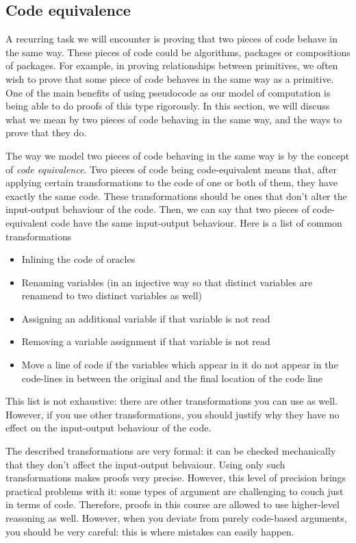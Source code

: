 \subsection{Code equivalence}
A recurring task we will encounter is proving that two pieces of code behave in the same way. These pieces of code could be algorithms, packages or compositions of packages. For example, in proving relationships between primitives, we often wish to prove that some piece of code behaves in the same way as a primitive. One of the main benefits of using pseudocode as our model of computation is being able to do proofs of this type rigorously. In this section, we will discuss what we mean by two pieces of code behaving in the same way, and the ways to prove that they do.

The way we model two pieces of code behaving in the same way is by the concept of \emph{code equivalence}. Two pieces of code being code-equivalent means that, after applying certain transformations to the code of one or both of them, they have exactly the same code. These transformations should be ones that don't alter the input-output behaviour of the code. Then, we can say that two pieces of code-equivalent code have the same input-output behaviour. Here is a list of common transformations
\begin{itemize}
    \item Inlining the code of oracles
    \item Renaming variables (in an injective way so that distinct variables are renamend to two distinct variables as well)
    \item Assigning an additional variable if that variable is not read
    \item Removing a variable assignment if that variable is not read
    \item Move a line of code if the variables which appear in it do not appear in the code-lines in between the original and the final location of the code line
\end{itemize}
This list is not exhaustive: there are other transformations you can use as well. However, if you use other transformations, you should justify why they have no effect on the input-output behaviour of the code.

The described transformations are very formal: it can be checked mechanically that they don't affect the input-output behvaiour. Using only such transformations makes proofs very precise. However, this level of precision brings practical problems with it: some types of argument are challenging to couch just in terms of code. Therefore, proofs in this course are allowed to use higher-level reasoning as well. However, when you deviate from purely code-based arguments, you should be very careful: this is where mistakes can easily happen.

